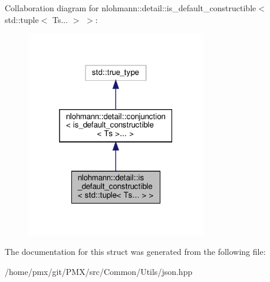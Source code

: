 Collaboration diagram for nlohmann\+:\+:detail\+:\+:is\+\_\+default\+\_\+constructible$<$ std\+:\+:tuple$<$ Ts... $>$ $>$\+:
\nopagebreak
\begin{figure}[H]
\begin{center}
\leavevmode
\includegraphics[width=223pt]{structnlohmann_1_1detail_1_1is__default__constructible_3_01std_1_1tuple_3_01Ts_8_8_8_01_4_01_4__coll__graph}
\end{center}
\end{figure}


The documentation for this struct was generated from the following file\+:\begin{DoxyCompactItemize}
\item 
/home/pmx/git/\+P\+M\+X/src/\+Common/\+Utils/json.\+hpp\end{DoxyCompactItemize}
